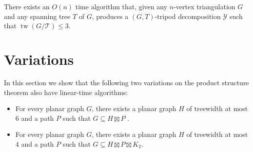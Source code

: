 \documentclass{patmorin}
\DeclareMathOperator{\tw}{tw}
\begin{document}
\begin{thm}
  There exists an $O(n)$ time algorithm that, given any $n$-vertex triangulation $G$ and any spanning tree $T$ of $G$, produces a $(G,T)$-tripod decomposition $\mathcal{Y}$ such that $\tw(G/\mathcal{T})\le 3$.
\end{thm}


\section{Variations}

In this section we show that the following two variations on the product structure theorem also have linear-time algorithms:
\begin{itemize}
  \item For every planar graph $G$, there exists a planar graph $H$ of  treewidth at most $6$ and a path $P$ such that $G\subseteq H\boxtimes P$ \cite{ueckerdt.wood.ea:XX}.
  \item For every planar graph $G$, there exists a planar graph $H$ of treewidth at most $4$ and a path $P$ such that $G\subseteq H\boxtimes P\boxtimes K_2$.
\end{itemize}
\end{document}
